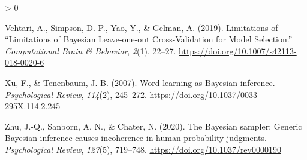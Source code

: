 \documentclass[
  english,
  man,floatsintext]{apa6}
\newlength{\cslhangindent}
\newenvironment{CSLReferences}[2] %
 {%
  \setlength{\parindent}{0pt}
  \ifodd #1 \everypar{\setlength{\hangindent}{\cslhangindent}}\ignorespaces\fi
  \ifnum #2 > 0
  \setlength{\parskip}{#2\baselineskip}
  \fi
 }%
 {}
\begin{document}
\begin{CSLReferences}{1}{0}
\leavevmode\hypertarget{ref-vehtari.etal2019}{}%
Vehtari, A., Simpson, D. P., Yao, Y., \& Gelman, A. (2019). Limitations of {``{Limitations} of {Bayesian Leave}-one-out {Cross}-{Validation} for {Model Selection}.''} \emph{Computational Brain \& Behavior}, \emph{2}(1), 22--27. \url{https://doi.org/10.1007/s42113-018-0020-6}

\leavevmode\hypertarget{ref-xu.tenenbaum2007}{}%
Xu, F., \& Tenenbaum, J. B. (2007). Word learning as {Bayesian} inference. \emph{Psychological Review}, \emph{114}(2), 245--272. \url{https://doi.org/10.1037/0033-295X.114.2.245}

\leavevmode\hypertarget{ref-zhu.etal2020}{}%
Zhu, J.-Q., Sanborn, A. N., \& Chater, N. (2020). The {Bayesian} sampler: {Generic Bayesian} inference causes incoherence in human probability judgments. \emph{Psychological Review}, \emph{127}(5), 719--748. \url{https://doi.org/10.1037/rev0000190}

\end{CSLReferences}
\end{document}
